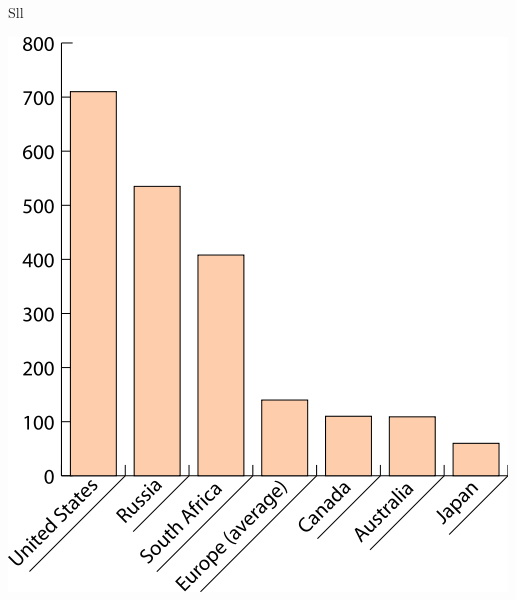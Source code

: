 \documentclass[print,Draft]{faosyb}
\begin{document}
\begin{chart}{S}{ll}
\caption{Incarceration ratest acroos countries: First ll chart}
\label{chart:incarceration}
\includegraphics[width=\chartwidth,height=\chartheight]{incarceration}  
\end{chart}
\lipsum[5-12]

\begin{tablepages}
\small
  
\clearpage

\clearpage

\clearpage

\end{tablepages}
\end{document}
